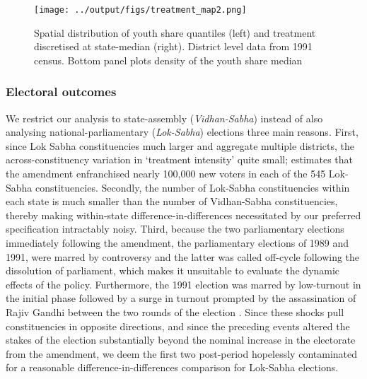 \begin{figure}[tb]
  \centering
  \texttt{[image: ../output/figs/treatment\_map2.png]}
  \caption{Spatial distribution of youth share quantiles (left) and
  treatment discretised at state-median (right). District level data from
  1991 census. Bottom panel plots density of the youth share median}
  \label{fig:map_panels}
\end{figure}

\subsubsection{Electoral outcomes}
We restrict our analysis to state-assembly (\emph{Vidhan-Sabha})
instead of also analysing national-parliamentary (\emph{Lok-Sabha})
elections three main reasons. First, since Lok Sabha constituencies
much larger and aggregate multiple districts, the across-constituency
variation in `treatment intensity' quite small;
\textcite{Pachauri1989-oc} estimates that the amendment enfranchised
nearly 100,000 new voters in each of the 545 Lok-Sabha constituencies.
Secondly, the number of Lok-Sabha constituencies within each state is
much smaller than the number of Vidhan-Sabha constituencies, thereby
making within-state difference-in-differences necessitated by our
preferred specification intractably noisy. Third, because the two
parliamentary elections immediately following the amendment, the
parliamentary elections of 1989 and 1991, were marred by controversy
and the latter was called off-cycle following the dissolution of
parliament, which makes it unsuitable to evaluate the dynamic effects
of the policy. Furthermore, the 1991 election was marred by
low-turnout in the initial phase followed by a surge in turnout
prompted by the assassination of Rajiv Gandhi between the two rounds
of the election \parencite{blakeslee2018politics}. Since these shocks
pull constituencies in opposite directions, and since the preceding
events altered the stakes of the election substantially beyond the
nominal increase in the electorate from the amendment, we deem the
first two post-period hopelessly contaminated for a reasonable
difference-in-differences comparison for Lok-Sabha elections.

